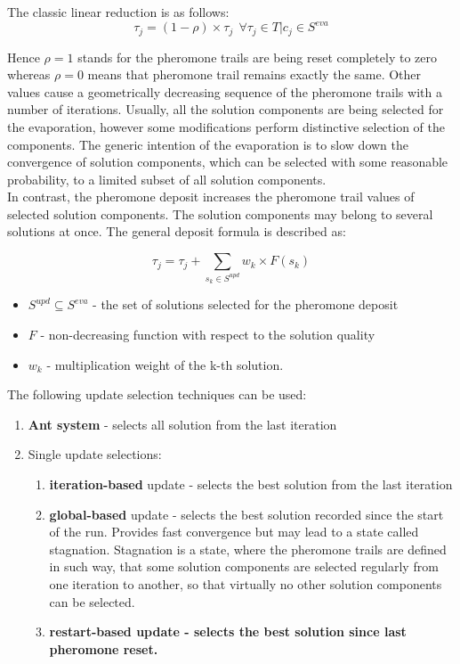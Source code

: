 The classic linear reduction is as follows:
\begin{equation}
\tau_j = (1-\rho) \times \tau_j \ \ \forall  \tau_j \in T | c_j \in S^{eva}
\end{equation}

Hence $\rho=1$ stands for the pheromone trails are being reset completely to zero whereas $\rho=0$ means that pheromone trail remains exactly the same. Other values cause a geometrically decreasing sequence of the pheromone trails with a number of iterations. Usually, all the solution components are being selected for the evaporation, however some modifications perform distinctive selection of the components. The generic intention of the evaporation is to slow down the convergence of solution components, which can be selected with some reasonable probability, to a limited subset of all solution components. \\

In contrast, the pheromone deposit increases the pheromone trail values of selected solution components. The solution components may belong to several solutions at once. The general deposit formula is described as:

\begin{equation}
\tau_j = \tau_j + \sum \limits_{s_k \in S^{upd}} w_k \times F(s_k)
\end{equation} 

\begin{itemize}
\item $S^{upd} \subseteq S^{eva}$ - the set of solutions selected for the pheromone deposit
\item $F$ - non-decreasing function with respect to the solution quality
\item $w_k$ - multiplication weight of the k-th solution.  
\end{itemize}

The following update selection techniques can be used:
\begin{enumerate}
\item {\textbf{Ant system} - selects all solution from the last iteration}
\item {Single update selections:}
\begin{enumerate}
\item {\textbf{iteration-based} update - selects the best solution from the last iteration}
\item {\textbf{global-based} update - selects the best solution recorded since the start of the run. Provides fast convergence but may lead to a state called stagnation. Stagnation is a state, where the pheromone trails are defined in such way, that some solution components are selected regularly from one iteration to another, so that virtually no other solution components can be selected.}
\item \textbf{{restart-based} update - selects the best solution since last pheromone reset.}
\end{enumerate}
\end{enumerate}

